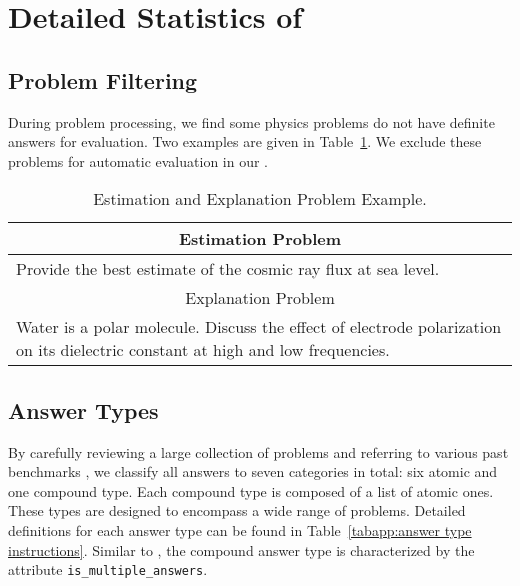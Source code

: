 \section{Detailed Statistics of {\benchmark}}\label{app: statistics}


\subsection{Problem Filtering}\label{app: filter}

During problem processing, we find some physics problems do not have definite answers for evaluation.
Two examples are given in Table~\ref{tabapp: filter_example}.
We exclude these problems for automatic evaluation in our {\benchmark}.

\begin{table}[b]
    \centering
    \footnotesize
    \caption{Estimation and Explanation Problem Example.}
    \begin{tabularx}{\textwidth}{|X|}
        \hline
        \multicolumn{1}{|c|}{Estimation Problem} \\
        \hline
        Provide the best estimate of the cosmic ray flux at sea level.
        \\
        \hline
        \multicolumn{1}{|c|}{Explanation Problem} \\
        \hline
        Water is a polar molecule. Discuss the effect of electrode polarization on its dielectric constant at high and low frequencies.
        \\
        \hline
    \end{tabularx}
    \label{tabapp: filter_example}
\end{table}




\subsection{Answer Types}\label{app: answer_type}
By carefully reviewing a large collection of problems and referring to various past benchmarks \citep{OlympiadBench2024He, OlympicArena2024huang, ugmathbench2025xu}, we classify all answers to seven categories in total: six atomic and one compound type.
Each compound type is composed of a list of atomic ones.
These types are designed to encompass a wide range of problems. 
Detailed definitions for each answer type can be found in Table~\ref{tabapp:answer type instructions}.
Similar to \citet{OlympiadBench2024He}, the compound answer type is characterized by the attribute \texttt{is\_multiple\_answers}.


